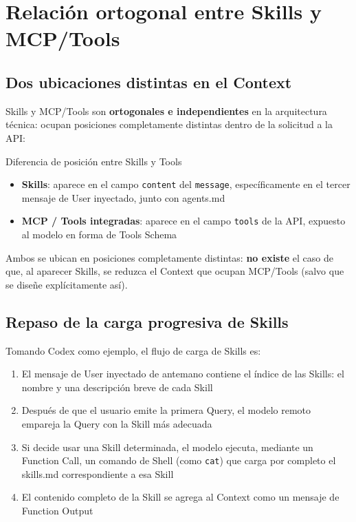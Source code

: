 \documentclass[a4paper]{article}
\begin{document}
\section{Relación ortogonal entre Skills y MCP/Tools}

\subsection{Dos ubicaciones distintas en el Context}

Skills y MCP/Tools son \textbf{ortogonales e independientes} en la arquitectura técnica: ocupan posiciones completamente distintas dentro de la solicitud a la API:

\begin{importantbox}{Diferencia de posición entre Skills y Tools}
\begin{itemize}
    \item \textbf{Skills}: aparece en el campo \texttt{content} del \texttt{message}, específicamente en el tercer mensaje de User inyectado, junto con agents.md
    \item \textbf{MCP / Tools integradas}: aparece en el campo \texttt{tools} de la API, expuesto al modelo en forma de Tools Schema
\end{itemize}
Ambos se ubican en posiciones completamente distintas: \textbf{no existe} el caso de que, al aparecer Skills, se reduzca el Context que ocupan MCP/Tools (salvo que se diseñe explícitamente así).
\end{importantbox}

\subsection{Repaso de la carga progresiva de Skills}

Tomando Codex como ejemplo, el flujo de carga de Skills es:

\begin{enumerate}
    \item El mensaje de User inyectado de antemano contiene el índice de las Skills: el nombre y una descripción breve de cada Skill
    \item Después de que el usuario emite la primera Query, el modelo remoto empareja la Query con la Skill más adecuada
    \item Si decide usar una Skill determinada, el modelo ejecuta, mediante un Function Call, un comando de Shell (como \texttt{cat}) que carga por completo el skills.md correspondiente a esa Skill
    \item El contenido completo de la Skill se agrega al Context como un mensaje de Function Output
\end{enumerate}
\end{document}
